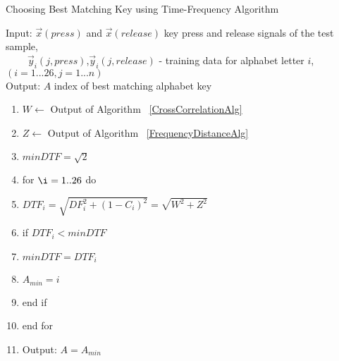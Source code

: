 \begin{algorithm}
	\caption{Choosing Best Matching Key using Time-Frequency Algorithm}          
	\label{TimeFreqAlg}
	
	Input: $\vec{x}(press)$ and $\vec{x}(release)$ key press and release signals of the test sample,\\
	$~~~~~~~~~~\vec{y}_i(j,press)$,$\vec{y}_i(j,release)$ - training data for alphabet letter $i$,
	$(i = 1...26, j = 1...n)$\\ 
	Output: $A$ index of best matching alphabet key\\
	
	\begin{enumerate}
		
		\item $W \gets$ Output of Algorithm ~\ref{CrossCorrelationAlg}  
		
		\item $Z \gets$ Output of Algorithm ~\ref{FrequencyDistanceAlg}
		
		\item $minDTF = \sqrt{2}$
		
		\item for $\i= 1..26$ do
		
		\item \hspace{5mm} $\displaystyle DTF_i = \sqrt{DF_i^2 + (1-C_i)^2} = \sqrt{W^2 + Z^2}$
		
		\item \hspace{5mm} if $DTF_i < minDTF$
		\item \hspace{10mm} $minDTF = DTF_i$
		\item \hspace{10mm} $A_{min} = i$
		\item \hspace{5mm} end if
		\item end for
		\item Output: $\displaystyle A=A_{min}$
		
	\end{enumerate}
	
\end{algorithm}



